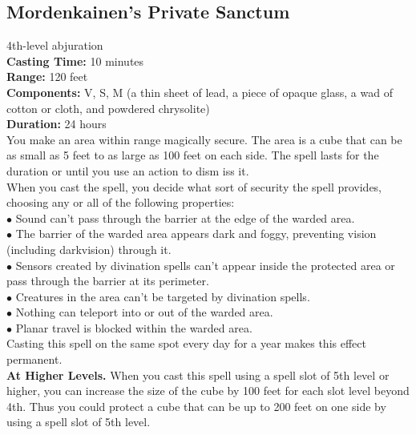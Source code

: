 \documentclass[11pt, A4paper, english]{article}
\begin{document}
		\subsection{Mordenkainen’s Private Sanctum}
4th-level abjuration \\
\textbf{Casting Time:} 10 minutes \\
\textbf{Range:} 120 feet \\
\textbf{Components:} V, S, M (a thin sheet of lead, a piece of opaque glass, a wad of cotton or cloth, and powdered chrysolite) \\
\textbf{Duration:} 24 hours \\
You make an area within range magically secure. The area is a cube that can be as small as 5 feet to as large as 100 feet on each side. The spell lasts for the duration or until you use an action to dism iss it. \\
When you cast the spell, you decide what sort of security the spell provides, choosing any or all of the following properties: \\
$\bullet$ Sound can't pass through the barrier at the edge of the warded area. \\
$\bullet$ The barrier of the warded area appears dark and foggy, preventing vision (including darkvision) through it. \\
$\bullet$ Sensors created by divination spells can’t appear inside the protected area or pass through the barrier at its perimeter. \\
$\bullet$ Creatures in the area can’t be targeted by divination spells. \\
$\bullet$ Nothing can teleport into or out of the warded area. \\
$\bullet$ Planar travel is blocked within the warded area. \\
Casting this spell on the same spot every day for a year makes this effect permanent. \\
\textbf{At Higher Levels.} When you cast this spell using a spell slot of 5th level or higher, you can increase the size of the cube by 100 feet for each slot level beyond 4th. Thus you could protect a cube that can be up to 200 feet on one side by using a spell slot of 5th level.
\end{document}
